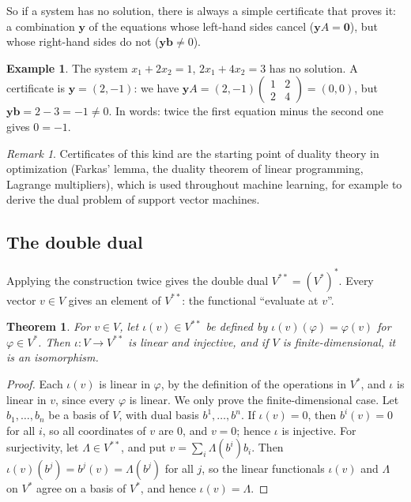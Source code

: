 \documentclass[11pt]{article}
\theoremstyle{definition}
\newtheorem{example}[definition]{Example}
\theoremstyle{plain}
\newtheorem{theorem}[definition]{Theorem}
\theoremstyle{remark}
\newtheorem{remark}[definition]{Remark}
\begin{document}
So if a system has no solution, there is always a simple certificate that proves it: a combination $\mathbf{y}$ of the equations whose left-hand sides cancel ($\mathbf{y}A = \mathbf{0}$), but whose right-hand sides do not ($\mathbf{y}\mathbf{b} \neq 0$).

\begin{example}
    The system $x_1 + 2x_2 = 1$, $2x_1 + 4x_2 = 3$ has no solution. A certificate is $\mathbf{y} = (2, -1)$: we have $\mathbf{y}A = (2, -1)\begin{pmatrix} 1 & 2 \\ 2 & 4 \end{pmatrix} = (0, 0)$, but $\mathbf{y}\mathbf{b} = 2 - 3 = -1 \neq 0$. In words: twice the first equation minus the second one gives $0 = -1$.
\end{example}

\begin{remark}
    Certificates of this kind are the starting point of duality theory in optimization (Farkas' lemma, the duality theorem of linear programming, Lagrange multipliers), which is used throughout machine learning, for example to derive the dual problem of support vector machines.
\end{remark}

\subsection{The double dual}

Applying the construction twice gives the double dual $V^{**} = (V^*)^*$. Every vector $v \in V$ gives an element of $V^{**}$: the functional ``evaluate at $v$''.

\begin{theorem}\label{thm:double-dual}
    For $v \in V$, let $\iota(v) \in V^{**}$ be defined by $\iota(v)(\varphi) = \varphi(v)$ for $\varphi \in V^*$. Then $\iota: V \to V^{**}$ is linear and injective, and if $V$ is finite-dimensional, it is an isomorphism.
\end{theorem}

\begin{proof}
    Each $\iota(v)$ is linear in $\varphi$, by the definition of the operations in $V^*$, and $\iota$ is linear in $v$, since every $\varphi$ is linear. We only prove the finite-dimensional case. Let $b_1, \ldots, b_n$ be a basis of $V$, with dual basis $b^1, \ldots, b^n$. If $\iota(v) = 0$, then $b^i(v) = 0$ for all $i$, so all coordinates of $v$ are $0$, and $v = 0$; hence $\iota$ is injective. For surjectivity, let $\Lambda \in V^{**}$, and put $v = \sum_i \Lambda(b^i) b_i$. Then $\iota(v)(b^j) = b^j(v) = \Lambda(b^j)$ for all $j$, so the linear functionals $\iota(v)$ and $\Lambda$ on $V^*$ agree on a basis of $V^*$, and hence $\iota(v) = \Lambda$.
\end{proof}
\end{document}
